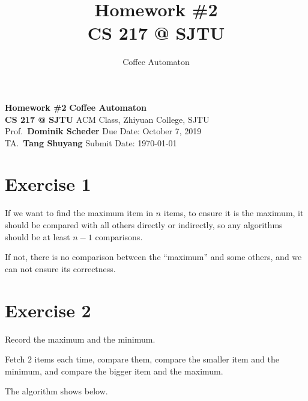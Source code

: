 \documentclass[
]{article}
\title{
  \vspace{2in}
  \textmd{\textbf{Homework \#2}}
  \normalsize\vspace{0.1in}\\
  \textmd{\textbf{CS 217 @ SJTU}}
  \normalsize\vspace{0.1in}\\
}
\author{Coffee Automaton}
\date{}
\begin{document}
\noindent
\large\textbf{Homework \#2}
\hfill
\textbf{Coffee Automaton} \\
\normalsize {\bf CS 217 @ SJTU} \hfill ACM Class, Zhiyuan College, SJTU\\
Prof.~{\bf Dominik Scheder} \hfill Due Date: October 7, 2019\\
  TA.~{\bf Tang Shuyang}
\hfill Submit Date: \today


\hypertarget{exercise-1}{%
\section{Exercise 1}\label{exercise-1}}

If we want to find the maximum item in \(n\) items, to ensure it is the
maximum, it should be compared with all others directly or indirectly,
so any algorithms should be at least \(n-1\) comparisons.

If not, there is no comparison between the ``maximum'' and some others,
and we can not ensure its correctness.

\hypertarget{exercise-2}{%
\section{Exercise 2}\label{exercise-2}}

Record the maximum and the minimum.

Fetch \(2\) items each time, compare them, compare the smaller item and
the minimum, and compare the bigger item and the maximum.

The algorithm shows below.
\end{document}
